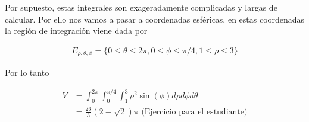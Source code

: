 \documentclass{article}
\theoremstyle{plain}
\theoremstyle{definition}
\begin{document}


Por supuesto, estas integrales son exageradamente complicadas y largas de calcular. Por ello nos vamos a pasar a coordenadas esf\'ericas, en estas coordenadas la regi\'on de integraci\'on viene dada por



\begin{align*}
    E_{\rho, \theta, \phi} = \lbrace 0 \leq \theta \leq 2\pi, 0\leq \phi \leq \pi/4,  1\leq \rho \leq 3 \rbrace
\end{align*}

Por lo tanto

\begin{align*}
    V &= \int_0^{2\pi} \int_0^{\pi/4} \int_1^3 \rho^2\sin(\phi)d\rho d\phi d\theta \\
    &= \frac{26}{3}(2-\sqrt{2})\pi \text{ (Ejercicio para el estudiante)}
\end{align*}
\end{document}
